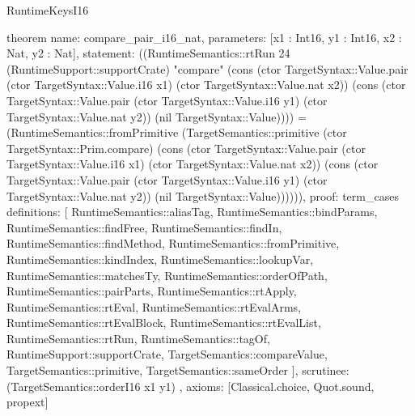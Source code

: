 \begin{lexlean}{RuntimeKeysI16}
\begin{semanticmodule}
theorem{
  name: compare_pair_i16_nat,
  parameters: [x1 : Int16, y1 : Int16, x2 : Nat, y2 : Nat],
  statement: ((RuntimeSemantics::rtRun 24 (RuntimeSupport::supportCrate) "compare" (cons (ctor TargetSyntax::Value.pair (ctor TargetSyntax::Value.i16 x1) (ctor TargetSyntax::Value.nat x2)) (cons (ctor TargetSyntax::Value.pair (ctor TargetSyntax::Value.i16 y1) (ctor TargetSyntax::Value.nat y2)) (nil TargetSyntax::Value)))) = (RuntimeSemantics::fromPrimitive (TargetSemantics::primitive (ctor TargetSyntax::Prim.compare) (cons (ctor TargetSyntax::Value.pair (ctor TargetSyntax::Value.i16 x1) (ctor TargetSyntax::Value.nat x2)) (cons (ctor TargetSyntax::Value.pair (ctor TargetSyntax::Value.i16 y1) (ctor TargetSyntax::Value.nat y2)) (nil TargetSyntax::Value)))))),
  proof: term_cases{
    definitions: [
      RuntimeSemantics::aliasTag,
      RuntimeSemantics::bindParams,
      RuntimeSemantics::findFree,
      RuntimeSemantics::findIn,
      RuntimeSemantics::findMethod,
      RuntimeSemantics::fromPrimitive,
      RuntimeSemantics::kindIndex,
      RuntimeSemantics::lookupVar,
      RuntimeSemantics::matchesTy,
      RuntimeSemantics::orderOfPath,
      RuntimeSemantics::pairParts,
      RuntimeSemantics::rtApply,
      RuntimeSemantics::rtEval,
      RuntimeSemantics::rtEvalArms,
      RuntimeSemantics::rtEvalBlock,
      RuntimeSemantics::rtEvalList,
      RuntimeSemantics::rtRun,
      RuntimeSemantics::tagOf,
      RuntimeSupport::supportCrate,
      TargetSemantics::compareValue,
      TargetSemantics::primitive,
      TargetSemantics::sameOrder
    ],
    scrutinee: (TargetSemantics::orderI16 x1 y1)
  },
  axioms: [Classical.choice, Quot.sound, propext]
}


\end{semanticmodule}
\end{lexlean}
